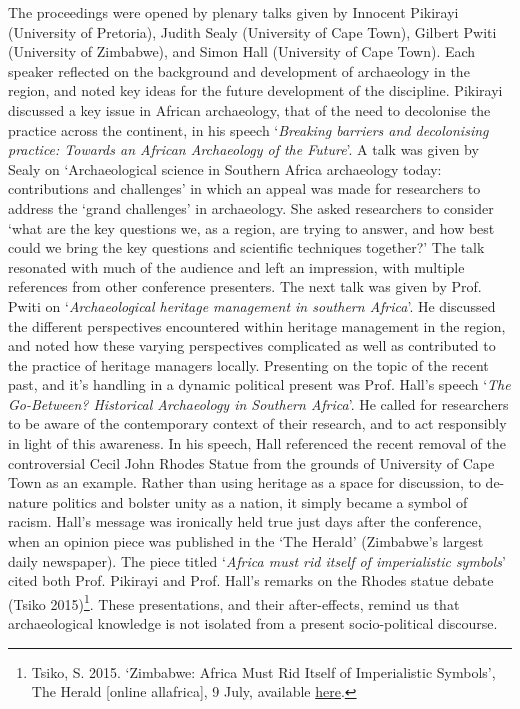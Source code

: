 	The proceedings were opened by plenary talks given by Innocent Pikirayi (University of Pretoria), Judith Sealy (University of Cape Town), Gilbert Pwiti (University of Zimbabwe), and Simon Hall (University of Cape Town). Each speaker reflected on the background and development of archaeology in the region, and noted key ideas for the future development of the discipline. Pikirayi discussed a key issue in African archaeology, that of the need to decolonise the practice across the continent, in his speech ‘\textit{Breaking barriers and decolonising practice: Towards an African Archaeology of the Future}’. A talk was given by Sealy on ‘Archaeological science in Southern Africa archaeology today: contributions and challenges’ in which an appeal was made for researchers to address the ‘grand challenges’ in archaeology. She asked researchers to consider ‘what are the key questions we, as a region, are trying to answer, and how best could we bring the key questions and scientific techniques together?’ The talk resonated with much of the audience and left an impression, with multiple references from other conference presenters. The next talk was given by Prof. Pwiti on ‘\textit{Archaeological heritage management in southern Africa}’. He discussed the different perspectives encountered within heritage management in the region, and noted how these varying perspectives complicated as well as contributed to the practice of heritage managers locally. Presenting on the topic of the recent past, and it’s handling in a dynamic political present was Prof. Hall’s speech ‘\textit{The Go-Between? Historical Archaeology in Southern Africa}’. He called for researchers to be aware of the contemporary context of their research, and to act responsibly in light of this awareness. In his speech, Hall referenced the recent removal of the controversial Cecil John Rhodes Statue from the grounds of University of Cape Town as an example.  Rather than using heritage as a space for discussion, to de-nature politics and bolster unity as a nation, it simply became a symbol of racism. Hall’s message was ironically held true just days after the conference, when an opinion piece was published in the ‘The Herald’ (Zimbabwe’s largest daily newspaper). The piece titled ‘\textit{Africa must rid itself of imperialistic symbols}’ cited both Prof. Pikirayi and Prof. Hall’s remarks on the Rhodes statue debate (Tsiko 2015)\texttt{}\footnote{Tsiko, S. 2015. ‘Zimbabwe: Africa Must Rid Itself of Imperialistic Symbols’, The Herald [online allafrica], 9 July, available \href{http://allafrica.com/stories/201507090355.html}{here}.}. These presentations, and their after-effects, remind us that archaeological knowledge is not isolated from a present socio-political discourse. 
	
